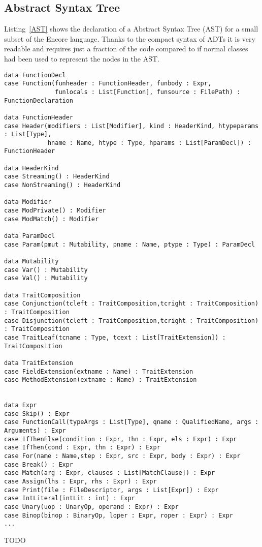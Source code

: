 \documentclass[10pt]{report}
\begin{document}
\subsection{Abstract Syntax Tree}
\par{Listing~\ref{AST} shows the declaration of a Abstract Syntax Tree (AST) for a small subset of the Encore language. Thanks to the compact syntax of ADTs it is very readable and requires just a fraction of the code compared to if normal classes had been used to represent the nodes in the AST.}
\begin{lstlisting}[language=encore,caption={Abstract Syntax Tree with ADTs},label=AST]
data FunctionDecl
case Function(funheader : FunctionHeader, funbody : Expr,
              funlocals : List[Function], funsource : FilePath) : FunctionDeclaration

data FunctionHeader
case Header(modifiers : List[Modifier], kind : HeaderKind, htypeparams : List[Type],
            hname : Name, htype : Type, hparams : List[ParamDecl]) : FunctionHeader

data HeaderKind
case Streaming() : HeaderKind
case NonStreaming() : HeaderKind

data Modifier
case ModPrivate() : Modifier
case ModMatch() : Modifier

data ParamDecl
case Param(pmut : Mutability, pname : Name, ptype : Type) : ParamDecl

data Mutability
case Var() : Mutability
case Val() : Mutability

data TraitComposition
case Conjunction(tcleft : TraitComposition,tcright : TraitComposition) : TraitComposition
case Disjunction(tcleft : TraitComposition,tcright : TraitComposition) : TraitComposition
case TraitLeaf(tcname : Type, tcext : List[TraitExtension]) : TraitComposition

data TraitExtension
case FieldExtension(extname : Name) : TraitExtension
case MethodExtension(extname : Name) : TraitExtension


data Expr
case Skip() : Expr
case FunctionCall(typeArgs : List[Type], qname : QualifiedName, args : Arguments) : Expr
case IfThenElse(condition : Expr, thn : Expr, els : Expr) : Expr
case IfThen(cond : Expr, thn : Expr) : Expr
case For(name : Name,step : Expr, src : Expr, body : Expr) : Expr
case Break() : Expr
case Match(arg : Expr, clauses : List[MatchClause]) : Expr
case Assign(lhs : Expr, rhs : Expr) : Expr
case Print(file : FileDescriptor, args : List[Expr]) : Expr
case IntLiteral(intLit : int) : Expr
case Unary(uop : UnaryOp, operand : Expr) : Expr
case Binop(binop : BinaryOp, loper : Expr, roper : Expr) : Expr
...
\end{lstlisting}
TODO
\end{document}

